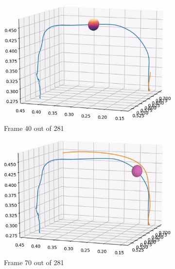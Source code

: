 \documentclass[../main.tex]{subfiles}
\begin{document}
\begin{figure}[H]
    \centering
    \begin{subfigure}[b]{0.32\textwidth}
        \centering
        \includegraphics[width=\textwidth]{figures/online_obs/tuned_param/3D_tuned-40.jpg}
        \caption{Frame 40 out of 281}
    \end{subfigure}
    \begin{subfigure}[b]{0.32\textwidth}
        \centering
        \includegraphics[width=\textwidth]{figures/online_obs/tuned_param/3D_tuned-70.jpg}
        \caption{Frame 70 out of 281}
    \end{subfigure}
    \hfill
    \begin{subfigure}[b]{0.32\textwidth}
        \centering

\end{subfigure}
\end{figure}
\end{document}
